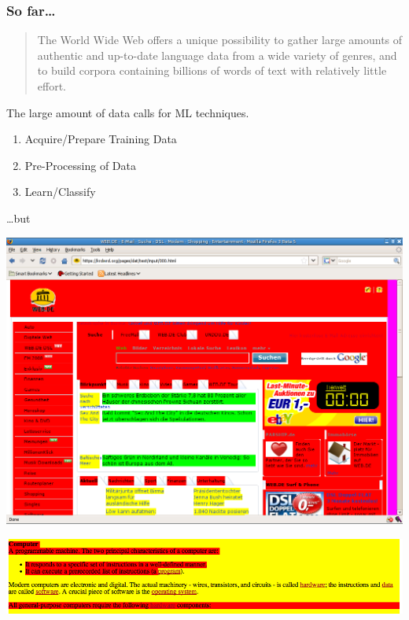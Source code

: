 \begin{frame}[allowframebreaks]
	\frametitle{So far\ldots}
\begin{quote}
The World Wide Web offers a unique possibility to gather large amounts of authentic and
up-to-date language data from a wide variety of genres, and to build corpora containing
billions of words of text with relatively little effort. {\tiny \cite{FIASCO2007}}
\end{quote}

\framebreak

The large amount of data calls for ML techniques.
\begin{enumerate}
	\item Acquire/Prepare Training Data
	\item Pre-Processing of Data
	\item Learn/Classify
\end{enumerate}

\framebreak
\ldots but
	\begin{center}
		\includegraphics[height=0.7\textheight]{20080522_pics/shot1.png} %
	\end{center}

\framebreak

	\begin{center}
		\includegraphics[width=\textwidth]{20080522_pics/bad.png} %
	\end{center}
\end{frame}


